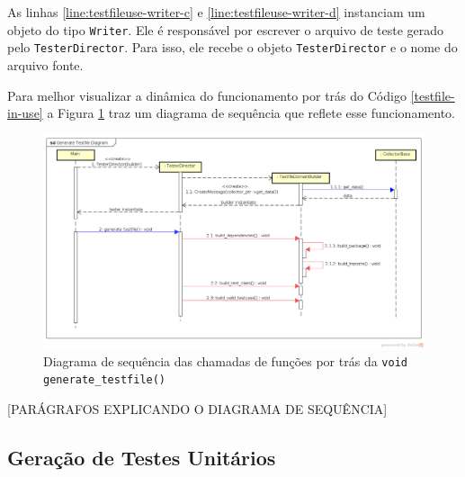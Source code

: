 As linhas \ref{line:testfileuse-writer-c} e \ref{line:testfileuse-writer-d}
instanciam um objeto do tipo \lstinline|Writer|. Ele é responsável por escrever
o arquivo de teste gerado pelo \lstinline|TesterDirector|. Para isso, ele
recebe o objeto \lstinline|TesterDirector| e o nome do arquivo fonte.

Para melhor visualizar a dinâmica do funcionamento por trás do Código
\ref{testfile-in-use} a Figura \ref{generate-testfile-sequence-diagram}
traz um diagrama de sequência que reflete esse funcionamento.

\begin{landscape}
\begin{figure}[h]
  \centering
    \includegraphics[width=1.5\textwidth]{figuras/generate-testfile-sequence-diagram.png}
    \caption{Diagrama de sequência das chamadas de funções por trás da \lstinline|void generate_testfile()|}
    \label{generate-testfile-sequence-diagram}
\end{figure}
\FloatBarrier
\end{landscape}

[PARÁGRAFOS EXPLICANDO O DIAGRAMA DE SEQUÊNCIA]

\subsection{Geração de Testes Unitários}


